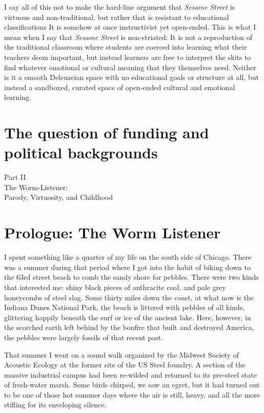 \documentclass[12pt,letterpaper]{article}
\begin{document}
	I say all of this not to make the hard-line argument that \textit{Sesame
	Street} is virtuous and non-traditional, but rather that is  
	resistant to educational classifications 
	It is somehow at once instructivist yet open-ended. This
	is what I mean when I say that \textit{Sesame Street} is non-striated: 
	It is not a reproduction of the traditional classroom where students are
	coerced into learning what their teachers deem important, but instead 
	learners are free to interpret the skits to find whatever emotional or 
	cultural meaning that they themselves need. Neither is it a smooth 
	Deleuzeian space with no educational goals or structure at all, but 
	instead a sandboxed, curated space of open-ended cultural and 
	emotional learning.



	\section*{The question of funding and political backgrounds}



	\newpage
	\thispagestyle{empty}
	\vspace*{30pt}
	\begin{center}
	{\Huge Part II\\ 
	\Large The Worm-Listener:\\
	Parody, Virtuosity, and Childhood}
	\end{center}


	\newpage
	\section*{Prologue: The Worm Listener}

	I spent something like a quarter of my life on the south side of 
	Chicago. There was a summer during that period where I got into the 
	habit of biking down to the 63rd street beach to comb the sandy shore 
	for pebbles. There were two kinds that interested me: shiny black 
	pieces of anthracite coal, and pale grey honeycombs of steel slag. Some
	thirty miles down the coast, at what now is the Indiana Dunes National 
	Park, the beach is littered with pebbles of all kinds, glittering 
	happily beneath the surf or ice of the ancient lake. Here, however, in 
	the scorched earth left behind by the bonfire that built and destroyed 
	America, the pebbles were largely fossils of that recent past.

	That summer I went on a sound walk organized by the Midwest Society of
	Acoustic Ecology at the former site of the US Steel foundry. A section 
	of the massive industrial campus had been re-wilded and returned to its
	pre-steel state of fresh-water marsh. Some birds chirped, we saw an 
	egret, but it had turned out to be one of those hot summer days where 
	the air is still, heavy, and all the more stifling for its enveloping 
	silence. 
\end{document}
